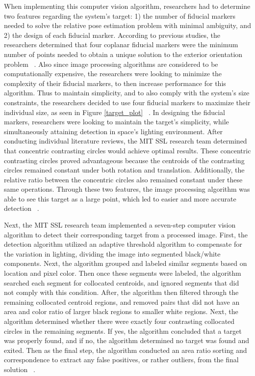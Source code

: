 \documentclass[journal, 10pt]{IEEEtran}
\begin{document}
When implementing this computer vision algorithm, researchers had to determine two features regarding the system's target: 1) the number of fiducial markers needed to solve the relative pose estimation problem with minimal ambiguity, and 2) the design of each fiducial marker. According to previous studies, the researchers determined that four coplanar fiducial markers were the minimum number of points needed to obtain a unique solution to the exterior orientation problem ~\cite{Thesis}. Also since image processing algorithms are considered to be computationally expensive, the researchers were looking to minimize the complexity of their fiducial markers, to then increase performance for this algorithm. Thus to maintain simplicity, and to also comply with the system's size constraints, the researchers decided to use four fiducial markers to maximize their individual size,  as seen in Figure \ref{target_plot} ~\cite{Vision, Thesis}. In designing the fiducial markers, researchers were looking to maintain the target's simplicity, while simultaneously attaining detection in space's lighting environment. After conducting individual literature reviews, the MIT SSL research team determined that concentric contrasting circles would achieve optimal results. These concentric contrasting circles proved advantageous because the centroids of the contrasting circles remained constant under both rotation and translation. Additionally, the relative ratio between the concentric circles also remained constant under these same operations. Through these two features,  the image processing algorithm was able to see this target as a large point, which led to easier and more accurate detection ~\cite{Vision, Thesis}. 

Next, the MIT SSL research team implemented a seven-step computer vision algorithm to detect their corresponding target from a processed image. First, the detection algorithm utilized an adaptive threshold algorithm to compensate for the variation in lighting, dividing the image into segmented black/white components. Next, the algorithm grouped and labeled similar segments based on location and pixel color. Then once these segments were labeled, the algorithm searched each segment for collocated centroids, and ignored segments that did not comply with this condition. After, the algorithm then filtered through the remaining collocated centroid regions, and removed pairs that did not have an area and color ratio of larger black regions to smaller white regions.  Next, the algorithm determined whether there were exactly four contrasting collocated circles in the remaining segments. If yes, the algorithm concluded that a target was properly found, and if no, the algorithm determined no target was found and exited. Then as the final step, the algorithm conducted an area ratio sorting and correspondence to extract any false positives, or rather outliers, from the final solution ~\cite{Vision, Thesis}.
\end{document}
